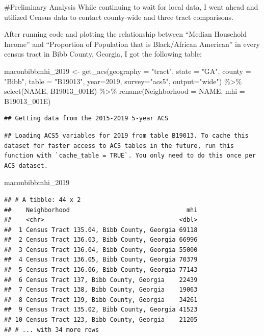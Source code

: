 \documentclass[
]{article}
\newenvironment{Shaded}{\begin{snugshade}}{\end{snugshade}}
\newcommand{\AttributeTok}[1]{\textcolor[rgb]{0.77,0.63,0.00}{#1}}
\newcommand{\DecValTok}[1]{\textcolor[rgb]{0.00,0.00,0.81}{#1}}
\newcommand{\FunctionTok}[1]{\textcolor[rgb]{0.00,0.00,0.00}{#1}}
\newcommand{\NormalTok}[1]{#1}
\newcommand{\OtherTok}[1]{\textcolor[rgb]{0.56,0.35,0.01}{#1}}
\newcommand{\SpecialCharTok}[1]{\textcolor[rgb]{0.00,0.00,0.00}{#1}}
\newcommand{\StringTok}[1]{\textcolor[rgb]{0.31,0.60,0.02}{#1}}
\begin{document}
\#Preliminary Analysis While continuing to wait for local data, I went
ahead and utilized Census data to contact county-wide and three tract
comparisons.

After running code and plotting the relationship between ``Median
Household Income'' and ``Proportion of Population that is Black/African
American'' in every census tract in Bibb County, Georgia, I got the
following table:

\begin{Shaded}
\begin{Highlighting}[]
\NormalTok{maconbibbmhi\_2019 }\OtherTok{\textless{}{-}} \FunctionTok{get\_acs}\NormalTok{(}\AttributeTok{geography =} \StringTok{"tract"}\NormalTok{, }\AttributeTok{state =} \StringTok{"GA"}\NormalTok{, }\AttributeTok{county =} \StringTok{"Bibb"}\NormalTok{, }\AttributeTok{table =} \StringTok{"B19013"}\NormalTok{, }\AttributeTok{year=}\DecValTok{2019}\NormalTok{, }\AttributeTok{survey=}\StringTok{"acs5"}\NormalTok{, }\AttributeTok{output=}\StringTok{"wide"}\NormalTok{) }\SpecialCharTok{\%\textgreater{}\%}
\FunctionTok{select}\NormalTok{(NAME, B19013\_001E) }\SpecialCharTok{\%\textgreater{}\%}
\FunctionTok{rename}\NormalTok{(}\AttributeTok{Neighborhood =}\NormalTok{ NAME, }\AttributeTok{mhi =}\NormalTok{ B19013\_001E) }
\end{Highlighting}
\end{Shaded}

\begin{verbatim}
## Getting data from the 2015-2019 5-year ACS
\end{verbatim}

\begin{verbatim}
## Loading ACS5 variables for 2019 from table B19013. To cache this dataset for faster access to ACS tables in the future, run this function with `cache_table = TRUE`. You only need to do this once per ACS dataset.
\end{verbatim}

\begin{Shaded}
\begin{Highlighting}[]
\NormalTok{maconbibbmhi\_2019 }
\end{Highlighting}
\end{Shaded}

\begin{verbatim}
## # A tibble: 44 x 2
##    Neighborhood                                mhi
##    <chr>                                     <dbl>
##  1 Census Tract 135.04, Bibb County, Georgia 69118
##  2 Census Tract 136.03, Bibb County, Georgia 66996
##  3 Census Tract 136.04, Bibb County, Georgia 55000
##  4 Census Tract 136.05, Bibb County, Georgia 70379
##  5 Census Tract 136.06, Bibb County, Georgia 77143
##  6 Census Tract 137, Bibb County, Georgia    22439
##  7 Census Tract 138, Bibb County, Georgia    19063
##  8 Census Tract 139, Bibb County, Georgia    34261
##  9 Census Tract 135.02, Bibb County, Georgia 41523
## 10 Census Tract 123, Bibb County, Georgia    21205
## # ... with 34 more rows
\end{verbatim}
\end{document}
